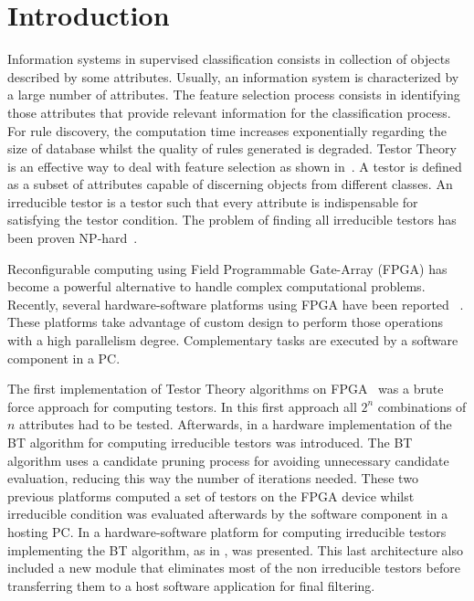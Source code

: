 \documentclass[conference]{IEEEtran}
\begin{document}
\section{Introduction}
Information systems in supervised classification consists in collection of objects described by some attributes.
Usually, an information system is characterized by a large number of attributes. The feature selection process
consists in identifying those attributes that provide relevant information for the classification process. 
For rule discovery, the computation time increases exponentially regarding the size of database whilst the quality 
of rules generated is degraded. Testor Theory is an effective way to deal with feature selection as shown
in~\cite{Ruiz08, Martinez01}. A testor is defined as a subset of attributes capable of discerning objects from different
classes. An irreducible testor is a testor such that every attribute is indispensable for satisfying the testor condition. The problem of finding all irreducible testors has been proven NP-hard~\cite{Skowron92}.

Reconfigurable computing using Field Programmable Gate-Array (FPGA) has become a powerful alternative to handle 
complex computational problems. Recently, several hardware-software platforms using FPGA have been reported~ \cite{Compton02,Pocek13}. These platforms take advantage of custom design to perform those operations with a high
parallelism degree. Complementary tasks are executed by a software component in a PC.

The first implementation of Testor Theory algorithms on FPGA~\cite{Cumplido06} was a brute force approach for computing
testors. In this first approach all $2^n$ combinations of $n$ attributes had to be tested. Afterwards, in \cite{Rojas07} a hardware implementation of the BT algorithm for computing irreducible testors was introduced. 
The BT algorithm uses a candidate pruning process for avoiding unnecessary candidate evaluation, 
reducing this way the number of iterations needed. These two previous platforms computed a set of testors on the 
FPGA device whilst irreducible condition was evaluated afterwards by the software component in a hosting PC. 
In \cite{Rojas12} a hardware-software platform for computing irreducible testors implementing the BT algorithm, 
as in \cite{Rojas07}, was presented. This last architecture also included a new module that eliminates most of 
the non irreducible testors before transferring them to a host software application for final filtering. 
\end{document}

